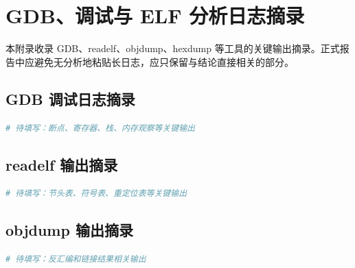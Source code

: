 \section{GDB、调试与 ELF 分析日志摘录}

本附录收录 GDB、readelf、objdump、hexdump 等工具的关键输出摘录。正式报告中应避免无分析地粘贴长日志，应只保留与结论直接相关的部分。

\subsection{GDB 调试日志摘录}

\begin{lstlisting}[language=bash,caption={GDB 调试日志摘录}]
# 待填写：断点、寄存器、栈、内存观察等关键输出
\end{lstlisting}

\subsection{readelf 输出摘录}

\begin{lstlisting}[language=bash,caption={readelf 输出摘录}]
# 待填写：节头表、符号表、重定位表等关键输出
\end{lstlisting}

\subsection{objdump 输出摘录}

\begin{lstlisting}[language=bash,caption={objdump 输出摘录}]
# 待填写：反汇编和链接结果相关输出
\end{lstlisting}
